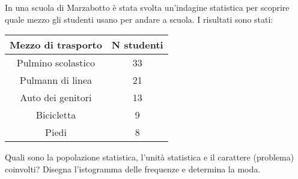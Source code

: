 \item In una scuola di Marzabotto è stata svolta un'indagine statistica per scoprire quale mezzo gli studenti usano per andare a scuola. I risultati sono stati: 	\newline
		\begin{center}
				\begin{tabular}{|c|c|}
				\hline
				Mezzo di trasporto & N studenti \\
				\hline
				Pulmino scolastico & 33 \\
				Pulmann di linea   & 21 \\
				Auto dei genitori  & 13 \\
				Bicicletta				 & 9 \\
				Piedi							 & 8 \\
				\hline
			\end{tabular}
		\end{center}
		Quali sono la popolazione statistica, l'unità statistica e il carattere (problema) coinvolti?\newline
		Disegna l'istogramma delle frequenze e determina la moda.